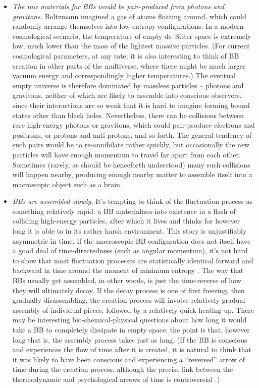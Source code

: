 \documentclass[12pt,letterpaper]{article}
\begin{document}
\begin{itemize}
\item{}\emph{The raw materials for BBs would be pair-produced from photons and gravitons.}
Boltzmann imagined a gas of atoms floating around, which could randomly arrange themselves into low-entropy configurations.
In a modern cosmological scenario, the temperature of empty de~Sitter space is extremely low, much lower than the mass of the lightest massive particles.
(For current cosmological parameters, at any rate; it is also interesting to think of BB creation in other parts of the multiverse, where there might be much larger vacuum energy and correspondingly higher temperatures.)
The eventual empty universe is therefore dominated by massless particles -- photons and gravitons, neither of which are likely to assemble into conscious observers, since their interactions are so weak that it is hard to imagine forming bound states other than black holes.
Nevertheless, there can be collisions between rare high-energy photons or gravitons, which could pair-produce electrons and positrons, or protons and anti-protons, and so forth.
The general tendency of such pairs would be to re-annihilate rather quickly, but occasionally the new particles will have enough momentum to travel far apart from each other.
Sometimes (rarely, as should be henceforth understood) many such collisions will happen nearby, producing enough nearby matter to assemble itself into a macroscopic object such as a brain.

\item{}\emph{BBs are assembled slowly.}
It's tempting to think of the fluctuation process as something relatively rapid: a BB materializes into existence in a flash of colliding high-energy particles, after which it lives and thinks for however long it is able to in its rather harsh environment.
This story is unjustifiably asymmetric in time.
If the macroscopic BB configuration does not itself have a good deal of time-directedness (such as angular momentum), it's not hard to show that most fluctuation processes are statistically identical forward and backward in time around the moment of minimum entropy \cite{Aguirre:2011ac}.
The way that BBs usually get assembled, in other words, is just the time-reverse of how they will ultimately decay.
If the decay process is one of first freezing, then gradually disassembling, the creation process will involve relatively gradual assembly of individual pieces, followed by a relatively quick heating-up.
There may be interesting bio-chemical-physical questions about how long it would take a BB to completely dissipate in empty space; the point is that, however long that is, the assembly process takes just as long.
(If the BB is conscious and experiences the flow of time after it is created, it is natural to think that it was likely to have been conscious and experiencing a ``reversed'' arrow of time during the creation process, although the precise link between the thermodynamic and psychological arrows of time is controversial \cite{schulman,maroney}.)


\end{itemize}
\end{document}
